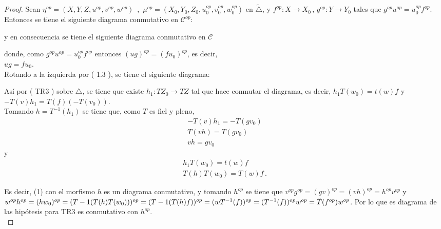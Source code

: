 \documentclass{article}
\begin{document}
\begin{enumerate}
\begin{proof}
 Sean $\eta^{op}=(X,Y,Z,u^{op},v^{op},w^{op})$ \,,\,
$\mu^{op}=(X_0,Y_0,Z_0,u_0^{op},v_0^{op},w_0^{op})$ en $\tilde{\triangle}$, y $f^{op}:X\to X_0\,,\,g^{op}:Y\to Y_0$ tales que 
$g^{op}u^{op}=u^{op}_0f^{op}$. Entonces se tiene el siguiente diagrama conmutativo en $\mathscr{C}^{op}$:\\

\centerline{
}
y en consecuencia se tiene el siguiente diagrama conmutativo en $\mathscr{C}$ \\

\centerline{
}

donde, como $g^{op}u^{op}=u_0^{op}f^{op}$ entonces $(ug)^{op}=(fu_0)^{op}$, es decir, \\$ug=fu_0$.\\

Rotando a la izquierda por ( 1.3 ), se tiene el siguiente diagrama:\\
\centerline{
}
Así por ( TR3 ) sobre $\triangle$, se tiene que existe $h_1:TZ_0\to TZ$ tal que hace conmutar el diagrama, es decir, $h_1T(w_0)=t(w)f$ y \\
$-T(v)h_1=T(f)(-T(v_0))$.\\

Tomando $h=T^{-1}(h_1)$ se tiene que, como $T$ es fiel y pleno,
\begin{gather*}
-T(v)h_1=-T(gv_0)\\
T(vh)=T(gv_0)\\
vh=gv_0
\end{gather*}
y
\begin{gather*}
h_1T(w_0)=t(w)f\\
T(h)T(w_0)=T(w)f\,.
\end{gather*}

Es decir, (1) con el morfismo $h$ es un diagrama conmutativo, y tomando $h^{op}$ se tiene que $v^{op}g^{op}=(gv)^{op}=(vh)^{op}=h^{op}v^{op}$
y \\ $w^{op}h^{op}=(hw_0)^{op}=(T-1(T(h)T(w_0)))^{op}=(T-1(T(h)f))^{op}=(wT^{-1}(f))^{op}\\
=(T^{-1}(f))^{op}w^{op}=\tilde{T}(f^{op})w^{op}$.
Por lo que es diagrama de las hipótesis para TR3 es conmutativo con $h^{op}$.\\


\end{proof}
\end{enumerate}
\end{document}
